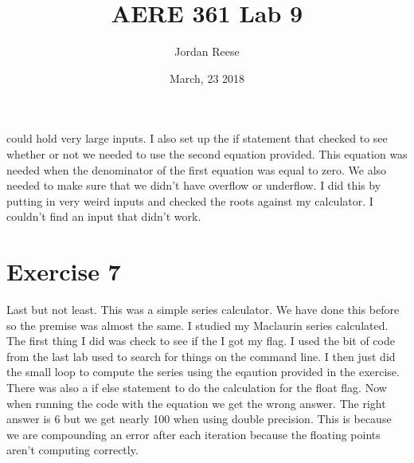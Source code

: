 \documentclass{article} \usepackage[utf8]{inputenc} \title{AERE 361 Lab 9} \author{Jordan Reese} \date{March, 23 2018} \usepackage{listings} \usepackage{color}
\begin{document}
could hold very large inputs. I also set up the if statement that checked to see whether or not we needed to use the second equation provided. This equation was 
needed when the denominator of the first equation was equal to zero. We also needed to make sure that we didn't have overflow or underflow. I did this by 
putting in very weird inputs and checked the roots against my calculator. I couldn't find an input that didn't work. \section{Exercise 7} Last but not least. 
This was a simple series calculator. We have done this before so the premise was almost the same. I studied my Maclaurin series calculated. The first thing I 
did was check to see if the I got my flag. I used the bit of code from the last lab used to search for things on the command line. I then just did the small 
loop to compute the series using the eqaution provided in the exercise. There was also a if else statement to do the calculation for the float flag. Now when 
running the code with the equation we get the wrong answer. The right answer is 6 but we get nearly 100 when using double precision. This is because we are 
compounding an error after each iteration because the floating points aren't computing correctly. 
\end{document}
